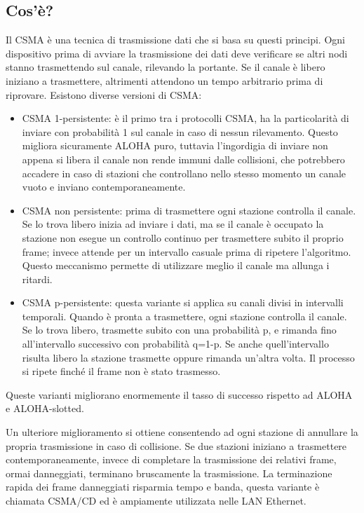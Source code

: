 \subsection{Cos'è?}
Il CSMA è una tecnica di trasmissione dati che si basa su questi principi.
Ogni dispositivo prima di avviare la trasmissione dei dati deve verificare se altri nodi stanno trasmettendo sul canale, rilevando la portante.
Se il canale è libero iniziano a trasmettere, altrimenti attendono un tempo arbitrario prima di riprovare.
Esistono diverse versioni di CSMA:
\begin{itemize}
\item	CSMA 1-persistente: è il primo tra i protocolli CSMA, ha la particolarità di inviare con probabilità 1 sul canale in caso di nessun rilevamento.
Questo migliora sicuramente ALOHA puro, tuttavia l’ingordigia di inviare non appena si libera il canale non rende immuni dalle collisioni, che potrebbero accadere in caso di stazioni che controllano nello stesso momento un canale vuoto e inviano contemporaneamente.
\item	CSMA non persistente: prima di trasmettere ogni stazione controlla il canale.
Se lo trova libero inizia ad inviare i dati, ma se il canale è occupato la stazione non esegue un controllo continuo per trasmettere subito il proprio frame;
invece attende per un intervallo casuale prima di ripetere l’algoritmo. Questo meccanismo permette di utilizzare meglio il canale ma allunga i ritardi.
\item	CSMA p-persistente: questa variante si applica su canali divisi in intervalli temporali.
Quando è pronta a trasmettere, ogni stazione controlla il canale.
Se lo trova libero, trasmette subito con una probabilità p, e rimanda fino all’intervallo successivo con probabilità q=1-p.
Se anche quell’intervallo risulta libero la stazione trasmette oppure rimanda un’altra volta. Il processo si ripete finché il frame non è stato trasmesso.
\end{itemize}
Queste varianti migliorano enormemente il tasso di successo rispetto ad ALOHA e ALOHA-slotted.

Un ulteriore miglioramento si ottiene consentendo ad ogni stazione di annullare la propria trasmissione in caso di collisione.
Se due stazioni iniziano a trasmettere contemporaneamente, invece di completare la trasmissione dei relativi frame, ormai danneggiati, terminano bruscamente la trasmissione.
La terminazione rapida dei frame danneggiati risparmia tempo e banda, questa variante è chiamata CSMA/CD ed è ampiamente utilizzata nelle LAN Ethernet.

